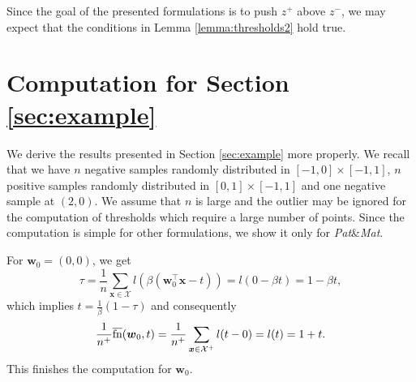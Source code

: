 \documentclass[]{interact}
\theoremstyle{plain}%
\theoremstyle{definition}
\theoremstyle{remark}
\newcommand{\toppush}{\emph{TopPush}\xspace}
\newcommand{\toppushk}{\emph{TopPushK}\xspace}
\newcommand{\grill}{\emph{Grill}\xspace}
\newcommand{\patmat}{\emph{Pat}\&\emph{Mat}\xspace}
\newcommand{\topmeank}{\emph{TopMean}\xspace}
\newcommand{\fns}{\overline{\textnormal{fn}}}
\newcommand{\Xcal}{\mathcal{X}}
\begin{document}
\noindent Since the goal of the presented formulations is to push $z^+$ above $z^-$, we may expect that the conditions in Lemma \ref{lemma:thresholds2} hold true. 



\section{Computation for Section \ref{sec:example}}\label{app:example}

We derive the results presented in Section \ref{sec:example} more properly. We recall that we have $n$ negative samples randomly distributed in $[-1,0]\times[-1,1]$, $n$ positive samples randomly distributed in $[0,1]\times[-1,1]$ and one negative sample at $(2,0)$. We assume that $n$ is large and the outlier may be ignored for the computation of thresholds which require a large number of points. Since the computation is simple for other formulations, we show it only for \patmat.

For $\bm w_0=(0,0)$, we get
$$
\tau = \frac{1}{n}\sum_{\bm x\in\Xcal}l(\beta(\bm w_0^\top \bm x-t)) = l(0-\beta t) = 1-\beta t,
$$
which implies $t=\frac{1}{\beta}(1-\tau)$ and consequently
$$
\frac{1}{n^+}\fns(\bm w_0,t) = \frac{1}{n^+}\sum_{\bm x\in \Xcal^+} l(t-0) = l(t) = 1+t.
$$
This finishes the computation for $\bm w_0$.
\end{document}
